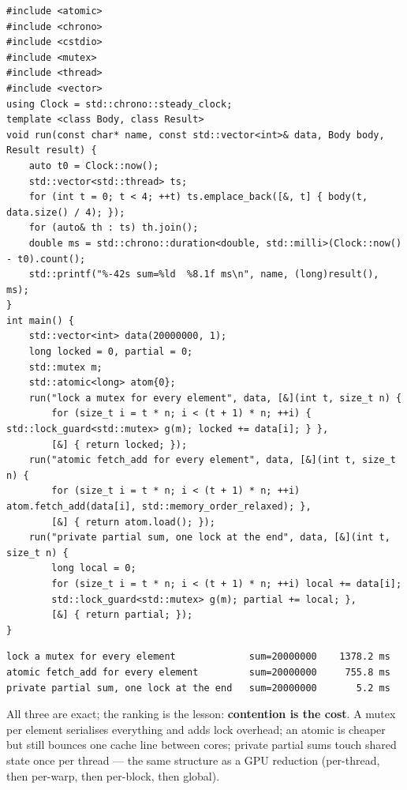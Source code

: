 \documentclass[10pt,a4paper,openany,oneside]{report}
\begin{document}
\begin{lstlisting}[language={[11]C++},basicstyle=\ttfamily\scriptsize]
#include <atomic>
#include <chrono>
#include <cstdio>
#include <mutex>
#include <thread>
#include <vector>
using Clock = std::chrono::steady_clock;
template <class Body, class Result>
void run(const char* name, const std::vector<int>& data, Body body, Result result) {
    auto t0 = Clock::now();
    std::vector<std::thread> ts;
    for (int t = 0; t < 4; ++t) ts.emplace_back([&, t] { body(t, data.size() / 4); });
    for (auto& th : ts) th.join();
    double ms = std::chrono::duration<double, std::milli>(Clock::now() - t0).count();
    std::printf("%-42s sum=%ld  %8.1f ms\n", name, (long)result(), ms);
}
int main() {
    std::vector<int> data(20000000, 1);
    long locked = 0, partial = 0;
    std::mutex m;
    std::atomic<long> atom{0};
    run("lock a mutex for every element", data, [&](int t, size_t n) {
        for (size_t i = t * n; i < (t + 1) * n; ++i) { std::lock_guard<std::mutex> g(m); locked += data[i]; } },
        [&] { return locked; });
    run("atomic fetch_add for every element", data, [&](int t, size_t n) {
        for (size_t i = t * n; i < (t + 1) * n; ++i) atom.fetch_add(data[i], std::memory_order_relaxed); },
        [&] { return atom.load(); });
    run("private partial sum, one lock at the end", data, [&](int t, size_t n) {
        long local = 0;
        for (size_t i = t * n; i < (t + 1) * n; ++i) local += data[i];
        std::lock_guard<std::mutex> g(m); partial += local; },
        [&] { return partial; });
}
\end{lstlisting}
\begin{lstlisting}[style=out,basicstyle=\ttfamily\scriptsize,title={Captured output (4 threads, 20 million elements)}]
lock a mutex for every element             sum=20000000    1378.2 ms
atomic fetch_add for every element         sum=20000000     755.8 ms
private partial sum, one lock at the end   sum=20000000       5.2 ms
\end{lstlisting}
All three are exact; the ranking is the lesson: \textbf{contention is the cost}. A mutex per element serialises everything and adds lock overhead; an atomic is cheaper but still bounces one cache line between cores; private partial sums touch shared state once per thread --- the same structure as a GPU reduction (per-thread, then per-warp, then per-block, then global).
\end{document}
